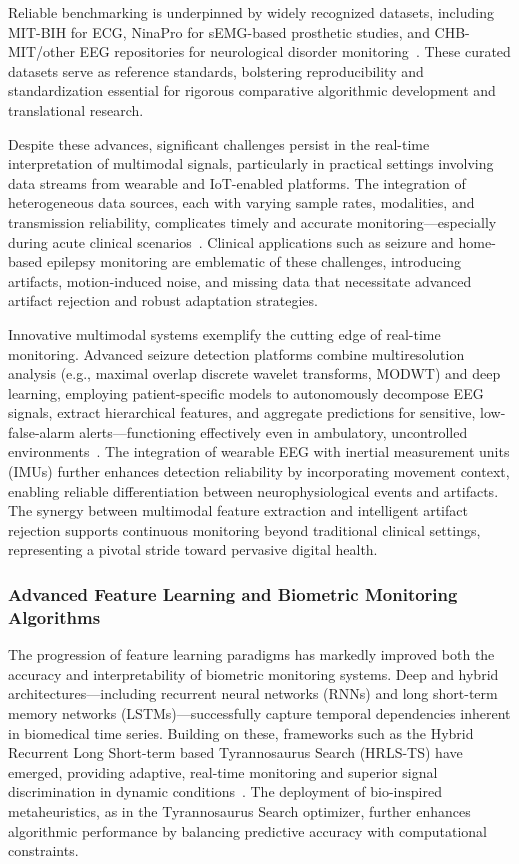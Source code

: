 \documentclass[sigconf]{acmart}
\begin{document}
Reliable benchmarking is underpinned by widely recognized datasets, including MIT-BIH for ECG, NinaPro for sEMG-based prosthetic studies, and CHB-MIT/other EEG repositories for neurological disorder monitoring~\cite{ref96,ref97,ref101}. These curated datasets serve as reference standards, bolstering reproducibility and standardization essential for rigorous comparative algorithmic development and translational research.

Despite these advances, significant challenges persist in the real-time interpretation of multimodal signals, particularly in practical settings involving data streams from wearable and IoT-enabled platforms. The integration of heterogeneous data sources, each with varying sample rates, modalities, and transmission reliability, complicates timely and accurate monitoring—especially during acute clinical scenarios~\cite{ref98,ref102,ref106,ref107}. Clinical applications such as seizure and home-based epilepsy monitoring are emblematic of these challenges, introducing artifacts, motion-induced noise, and missing data that necessitate advanced artifact rejection and robust adaptation strategies.

Innovative multimodal systems exemplify the cutting edge of real-time monitoring. Advanced seizure detection platforms combine multiresolution analysis (e.g., maximal overlap discrete wavelet transforms, MODWT) and deep learning, employing patient-specific models to autonomously decompose EEG signals, extract hierarchical features, and aggregate predictions for sensitive, low-false-alarm alerts—functioning effectively even in ambulatory, uncontrolled environments~\cite{ref98,ref102,ref103}. The integration of wearable EEG with inertial measurement units (IMUs) further enhances detection reliability by incorporating movement context, enabling reliable differentiation between neurophysiological events and artifacts. The synergy between multimodal feature extraction and intelligent artifact rejection supports continuous monitoring beyond traditional clinical settings, representing a pivotal stride toward pervasive digital health.

\subsubsection{Advanced Feature Learning and Biometric Monitoring Algorithms}

The progression of feature learning paradigms has markedly improved both the accuracy and interpretability of biometric monitoring systems. Deep and hybrid architectures—including recurrent neural networks (RNNs) and long short-term memory networks (LSTMs)—successfully capture temporal dependencies inherent in biomedical time series. Building on these, frameworks such as the Hybrid Recurrent Long Short-term based Tyrannosaurus Search (HRLS-TS) have emerged, providing adaptive, real-time monitoring and superior signal discrimination in dynamic conditions~\cite{ref107}. The deployment of bio-inspired metaheuristics, as in the Tyrannosaurus Search optimizer, further enhances algorithmic performance by balancing predictive accuracy with computational constraints.
\end{document}
